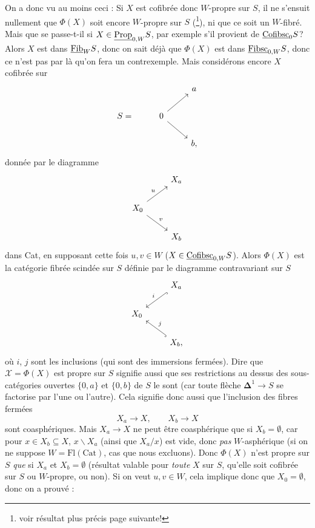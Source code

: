 \margbar On a donc vu au moins ceci : Si $X$ est cofibrée donc $W$-propre sur $S$, il ne s'ensuit nullement que $\Phi(X)$ soit encore $W$-propre sur $S$ (\footnote{voir résultat plus précis page suivante!}), ni que ce soit un $W$-fibré. Mais que se passe-t-il si $X \in \underline{\mathrm{Prop}}_{0,W}S$, par exemple s'il provient de $\underline{\mathrm{Cofibsc}}_0 S$? Alors $X$ est dans $\underline{\mathrm{Fib}}_W S$, donc on sait déjà que $\Phi(X)$ est dans $\underline{\mathrm{Fibsc}}_{0,W}S$, donc ce n'est pas par là qu'on fera un contrexemple. Mais considérons encore $X$ cofibrée sur
\[
\begin{tikzcd}
 & & a \\
S = & 0 \arrow[ur] \arrow[dr] & \\
 & & b,
\end{tikzcd}
\]
donnée par le diagramme
\[
\begin{tikzcd}
 & X_a \\
X_0 \arrow[ur, "u"] \arrow[dr, "v"] & \\
 & X_b
\end{tikzcd}
\]
dans Cat, en supposant cette fois $u, v \in W$ ($X \in \underline{\mathrm{Cofibsc}}_{0,W}S$). Alors $\Phi(X)$ est la catégorie fibrée scindée sur $S$ définie par le diagramme contravariant sur $S$
\[
\begin{tikzcd}
 & X_a \arrow[dl, hook, "i"'] \\
X_0 & \\
 & X_b, \arrow[ul, hook, "j"']
\end{tikzcd}
\]
où $i$, $j$ sont les inclusions (qui sont des immersions fermées). Dire que $\mathcal{X} = \Phi(X)$ est propre sur $S$ signifie aussi que ses restrictions au dessus des sous-catégories ouvertes $\{0,a\}$ et $\{0,b\}$ de $S$ le sont (car toute flèche $\mathbf{\Delta}^1 \longrightarrow S$ se factorise par l'une ou l'autre). Cela
signifie donc aussi que l'inclusion des fibres fermées
\[ X_a \longrightarrow X, \qquad X_b \longrightarrow X \]
sont coasphériques. Mais $X_a \longrightarrow X$ ne peut être coasphérique que si $X_b = \emptyset$, car pour $x \in X_b \subseteq X$, $x\backslash X_a$ (ainsi que $X_a/x$) est vide, donc \textit{pas} $W$-asphérique (si on ne suppose $W = \mathrm{Fl}(\mathrm{Cat})$, cas que nous excluons). Donc $\Phi(X)$ n'est propre sur $S$ \textit{que} si $X_a$ et $X_b = \emptyset$ (résultat valable pour \textit{toute} $X$ sur $S$, qu'elle soit cofibrée sur $S$ ou $W$-propre, ou non). Si on veut $u, v \in W$, cela implique donc que $X_0 = \emptyset$, donc on a prouvé :

